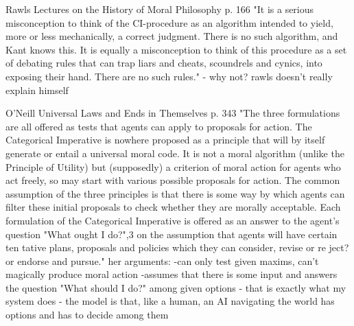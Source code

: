 Rawls Lectures on the History of Moral Philosophy p. 166
"It is a serious misconception to think of the CI-procedure as an algorithm intended to yield, more 
or less mechanically, a correct judgment. There is no such algorithm, and Kant knows this. It is 
equally a misconception to think of this procedure as a set of debating rules that can trap liars
and cheats, scoundrels and cynics, into exposing their hand. There are no
such rules."
- why not? rawls doesn't really explain himself

O'Neill Universal Laws and Ends in Themselves p. 343
"The three formulations are all offered as tests that agents can apply to
 proposals for action. The Categorical Imperative is nowhere proposed as a
 principle that will by itself generate or entail a universal moral code. It is not
 a moral algorithm (unlike the Principle of Utility) but (supposedly) a
 criterion of moral action for agents who act freely, so may start with
 various possible proposals for action. The common assumption of the three
 principles is that there is some way by which agents can filter these initial
 proposals to check whether they are morally acceptable. Each formulation
 of the Categorical Imperative is offered as an answer to the agent's question
 "What ought I do?",3 on the assumption that agents will have certain ten
 tative plans, proposals and policies which they can consider, revise or re
 ject?or endorse and pursue."
her arguments:
-can only test given maxims, can't magically produce moral action 
-assumes that there is some input and answers the question "What should I do?" among given options
  - that is exactly what my system does 
  - the model is that, like a human, an AI navigating the world has options and has to decide among them

